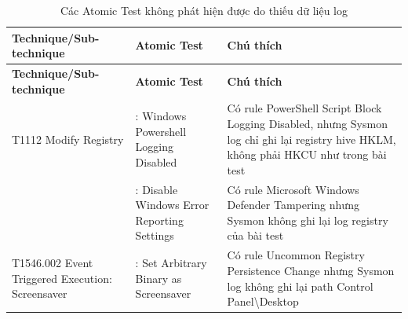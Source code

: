 \begingroup
\small
\renewcommand{\arraystretch}{1.12}
\setlength{\LTpre}{0pt}
\setlength{\LTpost}{0pt}
\begin{longtable}{|>{\raggedright\arraybackslash}p{3.2cm}|>{\raggedright\arraybackslash}p{5.5cm}|>{\raggedright\arraybackslash}p{5.8cm}|}
\caption{Các Atomic Test không phát hiện được do thiếu dữ liệu log}\label{tab:log-khong-du}\\
\hline
\textbf{Technique/Sub-technique} & \textbf{Atomic Test} & \textbf{Chú thích} \\
\hline
\endfirsthead
\hline
\textbf{Technique/Sub-technique} & \textbf{Atomic Test} & \textbf{Chú thích} \\
\hline
\endhead
\hline
\endfoot
\hline
\endlastfoot
T1112 Modify Registry & 33: Windows Powershell Logging Disabled & Có rule PowerShell Script Block Logging Disabled, nhưng Sysmon log chỉ ghi lại registry hive HKLM, không phải HKCU như trong bài test \\*
\cline{2-3}
 & 43: Disable Windows Error Reporting Settings & Có rule Microsoft Windows Defender Tampering nhưng Sysmon không ghi lại log registry của bài test \\
\hline
T1546.002 Event Triggered Execution: Screensaver & 1: Set Arbitrary Binary as Screensaver & Có rule Uncommon Registry Persistence Change nhưng Sysmon log không ghi lại path Control Panel\textbackslash{}Desktop \\
\hline
\end{longtable}
\endgroup
